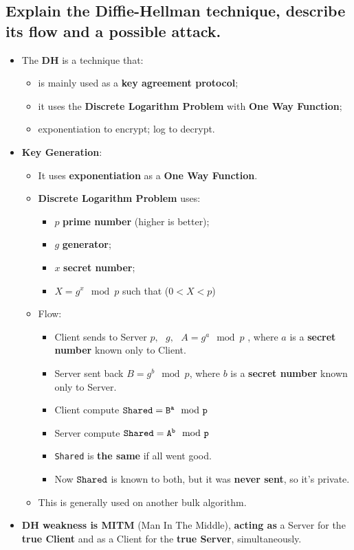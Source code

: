 \documentclass[9pt, letterpaper]{article}
\begin{document}
\subsection{Explain the Diffie-Hellman technique, describe its flow and a possible attack.}
\begin{itemize}
	\item The \textbf{DH} is a technique that:
	      \begin{itemize}
		      \item is mainly used as a \textbf{key agreement protocol};
		      \item it uses the \textbf{Discrete Logarithm Problem} with \textbf{One Way Function};
		      \item exponentiation to encrypt; log to decrypt.
	      \end{itemize}
	\item \textbf{Key Generation}:
	      \begin{itemize}
		      \item It uses \textbf{exponentiation} as a \textbf{One Way Function}.
		      \item \textbf{Discrete Logarithm Problem} uses:
		            \begin{itemize}
			            \item $p$ \textbf{prime number} (higher is better);
			            \item $g$ \textbf{generator};
			            \item $x$ \textbf{secret number};
			            \item $X = g^x \mod p$ such that ($0<X<p$)
		            \end{itemize}
		      \item Flow:
		            \begin{itemize}
			            \item Client sends to Server $p,\mbox{ }g,\mbox{  }A= g^a\mod p$ , where $a$ is a \textbf{secret number} known only to Client.
			            \item Server sent back $B=g^b\mod p$, where $b$ is a \textbf{secret number} known only to Server.
			            \item Client compute $\tt{Shared}=B^a\mod p$
			            \item Server compute $\tt{Shared}=A^b\mod p$
			            \item {\tt Shared} is \textbf{the same} if all went good.
			            \item Now $\tt{Shared}$ is known to both, but it was \textbf{never sent}, so it's private.
		            \end{itemize}
		      \item This is generally used on another bulk algorithm.
	      \end{itemize}
	\item \textbf{DH weakness is MITM} (Man In The Middle), \textbf{acting as} a Server for the \textbf{true Client} and as a Client for the \textbf{true Server}, simultaneously.
\end{itemize}
\end{document}

